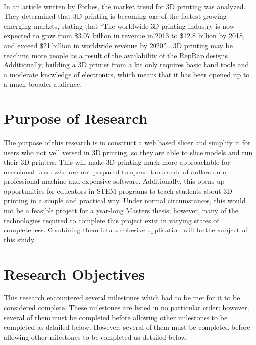 \paragraph{}
In an article written by Forbes, the market trend for 3D printing was analyzed.
They determined that 3D printing is becoming one of the fastest growing emerging markets, stating that
``The worldwide 3D printing industry is now expected to grow from \$3.07 billion in revenue in 2013 to \$12.8 billion by 2018, and exceed \$21 billion in worldwide revenue by 2020'' \citep{forbes3D}.
3D printing may be reaching more people as a result of the availability of the RepRap designs.
Additionally, building a 3D printer from a kit only requires basic hand tools and a moderate knowledge of electronics, which means that it has been opened up to a much broader audience.

\section{Purpose of Research}
\paragraph{}
The purpose of this research is to construct a web based slicer and simplify it for users who not well versed in 3D printing, so they are able to slice models and run their 3D printers.
This will make 3D printing much more approachable for occasional users who are not prepared to spend thousands of dollars on a professional machine and expensive software.
Additionally, this opens up opportunities for educators in STEM programs to teach students about 3D printing in a simple and practical way.
Under normal circumstances, this would not be a feasible project for a year-long Masters thesis; however, many of the technologies required to complete this project exist in varying states of completeness.
Combining them into a cohesive application will be the subject of this study.


\section{Research Objectives}
\paragraph{}
This research encountered several milestones which had to be met for it to be considered complete.
These milestones are listed in no particular order; however, several of them must be completed before allowing other milestones to be completed as detailed below.
However, several of them must be completed before allowing other milestones to be completed as detailed below.

